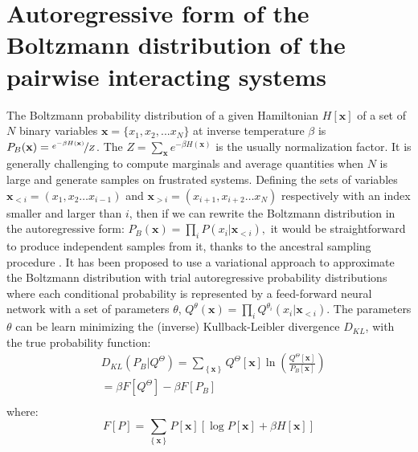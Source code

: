\documentclass[aps,physrev,10pt,floatfix,reprint]{revtex4-2}
\begin{document}
\section{Autoregressive form of the Boltzmann distribution of the pairwise interacting systems}
\label{sec:ARNN_boltzmann}
The Boltzmann probability distribution of a given Hamiltonian $H[\mathbf{x}]$ of a set of $N$ binary variables $\mathbf{x}=\{x_1, x_2,...x_N\}$ at inverse temperature $\beta$ is $P_{B}(\mathbf{x}) = \nicefrac{e^{-\beta H\left(\mathbf{x}\right)}}{Z}$. The $Z=\sum_{\mathbf{x}}e^{-\beta H\left(\mathbf{x}\right)}$ is the usually normalization factor.
It is generally challenging to compute marginals and average quantities when $N$ is large and generate samples on frustrated systems. Defining the sets of variables $\mathbf{x}_{<i}=\left(x_{1},x_{2}\dots x_{i-1}\right)$ and $\mathbf{x}_{>i}=\left(x_{i+1},x_{i+2}\dots x_{N}\right)$ respectively with an index smaller and larger than $i$, then if we can rewrite the Boltzmann distribution in the autoregressive form:
$
P_{B}\left(\mathbf{x}\right)=\prod_{i}P\left(x_{i}|\mathbf{x}_{<i}\right),
$
it would be straightforward to produce independent samples from it, thanks to the ancestral sampling procedure \cite{Wu2019}. It has been proposed \cite{Wu2019} to use a variational approach to approximate the Boltzmann distribution with trial autoregressive probability distributions where each conditional probability is represented by a feed-forward neural network with a set of parameters ${\theta}$,
$
Q^{\theta}\left(\mathbf{x}\right)=\prod_{i}Q^{\theta_i}\left(x_{i}|\mathbf{x}_{<i}\right)
$.
The parameters ${\theta}$ can be learn minimizing the (inverse) Kullback-Leibler divergence $D_{KL}$,
with the true probability function:
\begin{equation}
\begin{split}
& D_{KL}\left(P_{B}|Q^{\Theta}\right) =  \sum_{\left\{ \mathbf{x} \right\} } Q^{\Theta} [\mathbf{x}]\ln\left(\frac{Q^{\Theta}[\mathbf{x}]}{P_{B}[\mathbf{x}]}\right)  \\
& = \beta F[Q^{\Theta}] - \beta F[P_{B}]\\
\end{split}
\label{eq:kl}    
\end{equation}
where:
$$F[P]= \sum_{\left\{ \mathbf{x} \right\}}P[\mathbf{x}]\left[\log P[\mathbf{x}] + \beta H[\mathbf{x}] \right] 
$$
\end{document}
